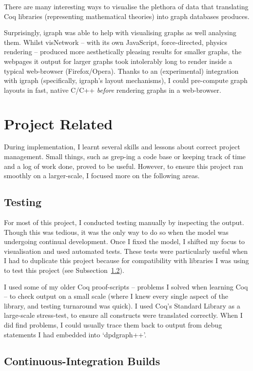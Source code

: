 There are many interesting ways to visualise the plethora of data that
translating Coq libraries (representing mathematical theories) into graph
databases produces.

Surprisingly, igraph was able to help with visualising graphs as well analysing
them.  Whilst visNetwork -- with its own JavaScript, force-directed, physics
rendering -- produced more aesthetically pleasing results for smaller graphs,
the webpages it output for larger graphs took intolerably long to render inside
a typical web-browser (Firefox/Opera). Thanks to an (experimental) integration
with igraph (specifically, igraph's layout mechanisms), I could pre-compute
graph layouts in fast, native C/C++ \emph{before} rendering graphs in a
web-browser.

\section{Project Related}

During implementation, I learnt several skills and lessons about correct project
management. Small things, such as grep-ing a code base or keeping track of time
and a log of work done, proved to be useful. However, to ensure this project ran
smoothly on a larger-scale, I focused more on the following areas.

\subsection{Testing}

For most of this project, I conducted testing manually by inspecting the output.
Though this was tedious, it was the only way to do so when the model was
undergoing continual development. Once I fixed the model, I shifted my focus to
visualisation and used automated tests. These tests were particularly useful
when I had to duplicate this project because for compatibility with libraries I
was using to test this project (see Subsection~\ref{subsec:cibuilds}).

I used some of my older Coq proof-scripts -- problems I solved when learning Coq
-- to check output on a small scale (where I knew every single aspect of the
library, and testing turnaround was quick). I used Coq's Standard Library as a
large-scale stress-test, to ensure all constructs were translated correctly.
When I did find problems, I could usually trace them back to output from debug
statements I had embedded into `dpdgraph++'.

\subsection{Continuous-Integration Builds}\label{subsec:cibuilds}

